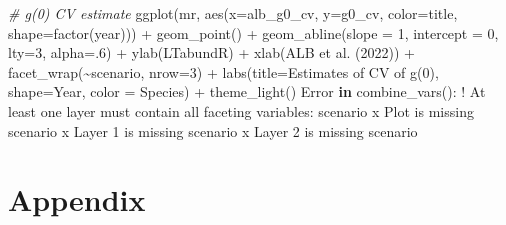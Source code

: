 \documentclass[
]{book}
\newenvironment{Shaded}{\begin{snugshade}}{\end{snugshade}}
\newcommand{\AttributeTok}[1]{\textcolor[rgb]{0.77,0.63,0.00}{#1}}
\newcommand{\CommentTok}[1]{\textcolor[rgb]{0.56,0.35,0.01}{\textit{#1}}}
\newcommand{\ControlFlowTok}[1]{\textcolor[rgb]{0.13,0.29,0.53}{\textbf{#1}}}
\newcommand{\DecValTok}[1]{\textcolor[rgb]{0.00,0.00,0.81}{#1}}
\newcommand{\FunctionTok}[1]{\textcolor[rgb]{0.00,0.00,0.00}{#1}}
\newcommand{\NormalTok}[1]{#1}
\newcommand{\SpecialCharTok}[1]{\textcolor[rgb]{0.00,0.00,0.00}{#1}}
\newcommand{\StringTok}[1]{\textcolor[rgb]{0.31,0.60,0.02}{#1}}
\begin{document}
\begin{Shaded}
\begin{Highlighting}[]
\CommentTok{\# g(0) CV estimate}
\FunctionTok{ggplot}\NormalTok{(mr,}
       \FunctionTok{aes}\NormalTok{(}\AttributeTok{x=}\NormalTok{alb\_g0\_cv, }\AttributeTok{y=}\NormalTok{g0\_cv, }
           \AttributeTok{color=}\NormalTok{title, }\AttributeTok{shape=}\FunctionTok{factor}\NormalTok{(year))) }\SpecialCharTok{+}
    \FunctionTok{geom\_point}\NormalTok{() }\SpecialCharTok{+}
    \FunctionTok{geom\_abline}\NormalTok{(}\AttributeTok{slope =} \DecValTok{1}\NormalTok{, }\AttributeTok{intercept =} \DecValTok{0}\NormalTok{, }\AttributeTok{lty=}\DecValTok{3}\NormalTok{, }\AttributeTok{alpha=}\NormalTok{.}\DecValTok{6}\NormalTok{) }\SpecialCharTok{+}
    \FunctionTok{ylab}\NormalTok{(}\StringTok{\textquotesingle{}LTabundR\textquotesingle{}}\NormalTok{) }\SpecialCharTok{+} \FunctionTok{xlab}\NormalTok{(}\StringTok{\textquotesingle{}ALB et al. (2022)\textquotesingle{}}\NormalTok{) }\SpecialCharTok{+}
  \FunctionTok{facet\_wrap}\NormalTok{(}\SpecialCharTok{\textasciitilde{}}\NormalTok{scenario, }\AttributeTok{nrow=}\DecValTok{3}\NormalTok{) }\SpecialCharTok{+} 
  \FunctionTok{labs}\NormalTok{(}\AttributeTok{title=}\StringTok{\textquotesingle{}Estimates of CV of g(0)\textquotesingle{}}\NormalTok{, }
       \AttributeTok{shape=}\StringTok{\textquotesingle{}Year\textquotesingle{}}\NormalTok{, }\AttributeTok{color =} \StringTok{\textquotesingle{}Species\textquotesingle{}}\NormalTok{) }\SpecialCharTok{+} 
  \FunctionTok{theme\_light}\NormalTok{()}
\NormalTok{Error }\ControlFlowTok{in} \StringTok{\textasciigrave{}}\AttributeTok{combine\_vars()}\StringTok{\textasciigrave{}}\SpecialCharTok{:}
\SpecialCharTok{!}\NormalTok{ At least one layer must contain all faceting variables}\SpecialCharTok{:} \StringTok{\textasciigrave{}}\AttributeTok{scenario}\StringTok{\textasciigrave{}}
\NormalTok{x Plot is missing }\StringTok{\textasciigrave{}}\AttributeTok{scenario}\StringTok{\textasciigrave{}}
\NormalTok{x Layer }\DecValTok{1}\NormalTok{ is missing }\StringTok{\textasciigrave{}}\AttributeTok{scenario}\StringTok{\textasciigrave{}}
\NormalTok{x Layer }\DecValTok{2}\NormalTok{ is missing }\StringTok{\textasciigrave{}}\AttributeTok{scenario}\StringTok{\textasciigrave{}}
\end{Highlighting}
\end{Shaded}

\hypertarget{part-appendix}{%
\part{Appendix}\label{part-appendix}}
\end{document}
